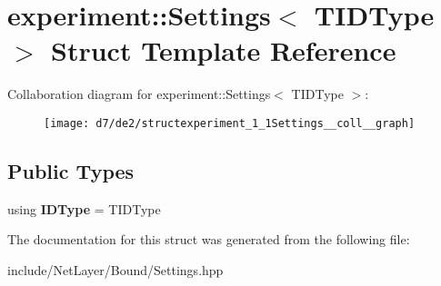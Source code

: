 \hypertarget{structexperiment_1_1Settings}{}\section{experiment\+:\+:Settings$<$ T\+I\+D\+Type $>$ Struct Template Reference}
\label{structexperiment_1_1Settings}


Collaboration diagram for experiment\+:\+:Settings$<$ T\+I\+D\+Type $>$\+:\nopagebreak
\begin{figure}[H]
\begin{center}
\leavevmode
\texttt{[image: d7/de2/structexperiment\_1\_1Settings\_\_coll\_\_graph]}
\end{center}
\end{figure}
\subsection*{Public Types}
\begin{DoxyCompactItemize}
\item 
\hypertarget{structexperiment_1_1Settings_a464b29ad8283cfb1404054398a23852c}{}using {\bfseries I\+D\+Type} = T\+I\+D\+Type\label{structexperiment_1_1Settings_a464b29ad8283cfb1404054398a23852c}

\end{DoxyCompactItemize}


The documentation for this struct was generated from the following file\+:\begin{DoxyCompactItemize}
\item 
include/\+Net\+Layer/\+Bound/Settings.\+hpp\end{DoxyCompactItemize}
